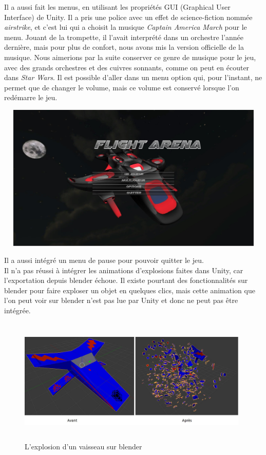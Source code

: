 \documentclass[10pt, titlepage]{report}
\begin{document}
 Il a aussi fait les menus, en utilisant les propriétés GUI (Graphical User Interface) de Unity. Il a pris une police avec un effet de science-fiction nommée \textit{airstrike}, et c'est lui qui a choisit la musique \textit{Captain America March} pour le menu. Jouant de la trompette, il l'avait interprété dans un orchestre l'année dernière, mais pour plus de confort, nous avons mis la version officielle de la musique. Nous aimerions par la suite conserver ce genre de musique pour le jeu, avec des grands orchestres et des cuivres sonnants, comme on peut en écouter dans \textit{Star Wars}. Il est possible d'aller dans un menu option qui, pour l'instant, ne permet que de changer le volume, mais ce volume est conservé lorsque l'on redémarre le jeu.

\begin{center}
\includegraphics[height=7cm, width=14cm]{menu_arthur.jpg}\\
\end{center}

Il a aussi intégré un menu de pause pour pouvoir quitter le jeu.\\

Il n'a pas réussi à intégrer les animations d'explosions faites dans Unity, car l'exportation depuis blender échoue. Il existe pourtant des fonctionnalités sur blender pour faire exploser un objet en quelques clics, mais cette animation que l'on peut voir sur blender n'est pas lue par Unity et donc ne peut pas être intégrée.

\begin{figure}
\center
\includegraphics[height=6cm, width=11cm]{explosion_arthur.jpg}
\caption{L'explosion d'un vaisseau sur blender}
\end{figure}
\end{document}
